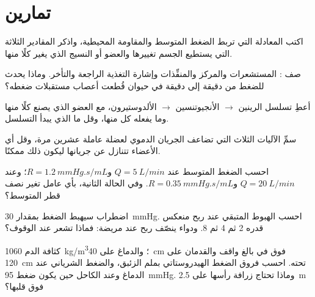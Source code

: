 \section{تمارين}

\begin{exercise}[$\star$]\label{exo:b2:blood-pressure:1}
اكتب المعادلة التي تربط الضغط المتوسط 
والمقاومة المحيطية، واذكر المقادير الثلاثة التي يستطيع الجسم
تغييرها والعضو أو النسيج الذي يغير كلًا منها.
\end{exercise}

\begin{exercise}[$\star$]\label{exo:b2:blood-pressure:2}
صف : المستشعرات والمركز والمنفِّذات وإشارة
التغذية الراجعة والتأخر. وماذا يحدث للضغط من دقيقة إلى دقيقة
في حيوان قُطعت أعصاب مستقبلات ضغطه؟
\end{exercise}

\begin{exercise}[$\star$]\label{exo:b2:blood-pressure:3}
أعطِ تسلسل الرينين $\to$ الأنجيوتنسين $\to$ الألدوستيرون، مع
العضو الذي يصنع كلًا منها وما يفعله كل منها، وقل ما الذي يبدأ
التسلسل.
\end{exercise}

\begin{exercise}[$\star$]\label{exo:b2:blood-pressure:4}
سمِّ الآليات الثلاث التي تضاعف الجريان الدموي لعضلة
عاملة عشرين مرة، وقل أي الأعضاء تتنازل عن جريانها ليكون
ذلك ممكنًا.
\end{exercise}

\begin{exercise}[$\star\star$]\label{exo:b2:blood-pressure:5}
احسب الضغط المتوسط عند $Q = \qty{5}{L/min}$ و$R =
\qty{1.2}{mmHg.s/mL}$؛ وعند $Q = \qty{20}{L/min}$ و$R =
\qty{0.35}{mmHg.s/mL}$. وفي الحالة الثانية، بأي عامل تغير
نصف قطر  المتوسط؟
\end{exercise}

\begin{exercise}[$\star\star$]\label{exo:b2:blood-pressure:6}
اضطراب سيهبط الضغط بمقدار \qty{30}{mmHg}. احسب
الهبوط المتبقي عند ربح منعكس قدره 2 ثم 4 ثم 8. ودواء ينصّف ربح
 عند مريضة: فماذا تشعر عند الوقوف؟
\end{exercise}

\begin{exercise}[$\star\star$]\label{exo:b2:blood-pressure:7}
كثافة الدم \qty{1060}{kg/m^3}؛ والدماغ على \qty{40}{cm} فوق
 في بالغ واقف والقدمان على \qty{120}{cm} تحته. احسب
فروق الضغط الهيدروستاتي بملم الزئبق، والضغط
الشرياني عند الدماغ وعند الكاحل حين يكون ضغط 
\qty{95}{mmHg}. وماذا تحتاج زرافة رأسها على \qty{2.5}{m} فوق
قلبها؟
\end{exercise}


